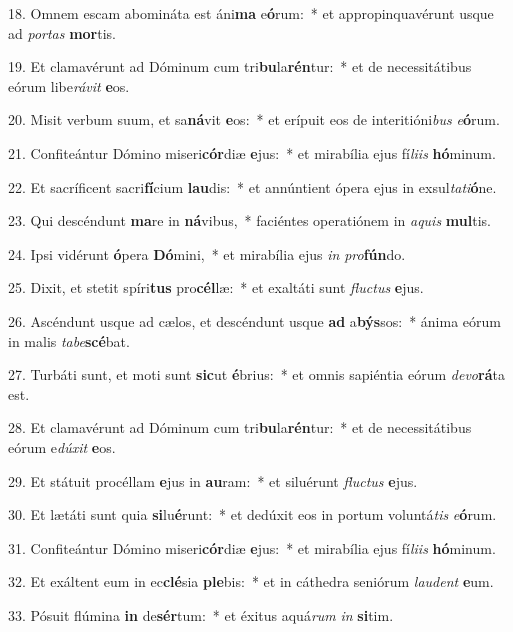 18. Omnem escam abomináta est áni\textbf{ma} e\textbf{ó}rum:~*  et appropinquavérunt usque ad \textit{por}\textit{tas} \textbf{mor}tis.\

19. Et clamavérunt ad Dóminum cum tri\textbf{bu}la\textbf{rén}tur:~*  et de necessitátibus eórum libe\textit{rá}\textit{vit} \textbf{e}os.\

20. Misit verbum suum, et sa\textbf{ná}vit \textbf{e}os:~*  et erípuit eos de interitióni\textit{bus} \textit{e}\textbf{ó}rum.\

21. Confiteántur Dómino miseri\textbf{cór}diæ \textbf{e}jus:~*  et mirabília ejus fí\textit{li}\textit{is} \textbf{hó}minum.\

22. Et sacríficent sacri\textbf{fí}cium \textbf{lau}dis:~*  et annúntient ópera ejus in exsul\textit{ta}\textit{ti}\textbf{ó}ne.\

23. Qui descéndunt \textbf{ma}re in \textbf{ná}vibus,~*  faciéntes operatiónem in \textit{a}\textit{quis} \textbf{mul}tis.\

24. Ipsi vidérunt \textbf{ó}pera \textbf{Dó}mini,~*  et mirabília ejus \textit{in} \textit{pro}\textbf{fún}do.\

25. Dixit, et stetit spíri\textbf{tus} pro\textbf{cél}læ:~*  et exaltáti sunt \textit{fluc}\textit{tus} \textbf{e}jus.\

26. Ascéndunt usque ad cælos, et descéndunt usque \textbf{ad} a\textbf{býs}sos:~*  ánima eórum in malis \textit{ta}\textit{be}\textbf{scé}bat.\

27. Turbáti sunt, et moti sunt \textbf{sic}ut \textbf{é}brius:~*  et omnis sapiéntia eórum \textit{de}\textit{vo}\textbf{rá}ta est.\

28. Et clamavérunt ad Dóminum cum tri\textbf{bu}la\textbf{rén}tur:~*  et de necessitátibus eórum e\textit{dú}\textit{xit} \textbf{e}os.\

29. Et státuit procéllam \textbf{e}jus in \textbf{au}ram:~*  et siluérunt \textit{fluc}\textit{tus} \textbf{e}jus.\

30. Et lætáti sunt quia \textbf{si}lu\textbf{é}runt:~*  et dedúxit eos in portum voluntá\textit{tis} \textit{e}\textbf{ó}rum.\

31. Confiteántur Dómino miseri\textbf{cór}diæ \textbf{e}jus:~*  et mirabília ejus fí\textit{li}\textit{is} \textbf{hó}minum.\

32. Et exáltent eum in ec\textbf{clé}sia \textbf{ple}bis:~*  et in cáthedra seniórum \textit{lau}\textit{dent} \textbf{e}um.\

33. Pósuit flúmina \textbf{in} de\textbf{sér}tum:~*  et éxitus aquá\textit{rum} \textit{in} \textbf{si}tim.\

